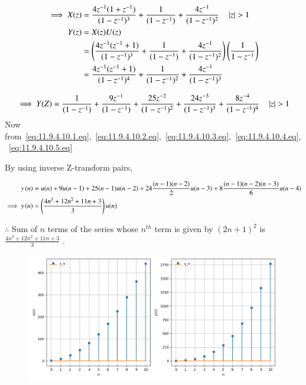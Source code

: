 \documentclass[journal,12pt,onecolumn]{IEEEtran}
\theoremstyle{remark}
\begin{document}
\begin{align}
\implies  X(z)&=\frac{4z^{-1}(1+z^{-1})}{(1-z^{-1})^3} + \frac{1}{(1-z^{-1})} + \frac{4z^{-1}}{(1-z^{-1})^2} \quad \left\vert z\right\vert>1 \\
 Y(z) &= X(z)U(z) \\
 &= \left(\frac{4z^{-1}(z^{-1}+1)}{(1-z^{-1})^3} + \frac{1}{(1-z^{-1})} + \frac{4z^{-1}}{(1-z^{-1})^2}\right)\left(\frac{1}{1-z^{-1}}\right)\\
 &= \frac{4z^{-1}(z^{-1}+1)}{(1-z^{-1})^4} + \frac{1}{(1-z^{-1})^2} + \frac{4z^{-1}}{(1-z^{-1})^3}
 \end{align}
 
 \begin{equation}
\implies Y(Z)=\frac{1}{(1-z^{-1})} +\frac{9z^{-1}}{(1-z^{-1})} + \frac{25z^{-2}}{(1-z^{-1})^2} + \frac{24z^{-3}}{(1-z^{-1})^3} + \frac{8z^{-4}}{(1-z^{-1})^4} \quad \left\vert z\right\vert>1  \label{eq:11.9.4.10.5.eq}
 \end{equation}
Now from~\eqref{eq:11.9.4.10.1.eq},~\eqref{eq:11.9.4.10.2.eq},~\eqref{eq:11.9.4.10.3.eq},~\eqref{eq:11.9.4.10.4.eq},
 ~\eqref{eq:11.9.4.10.5.eq}

By using  inverse Z-transform pairs,


\begin{align}
  y\left(n\right)&= u(n) + 9u(n-1) + 25(n-1)u(n-2) + 24\frac{(n-1)(n-2)}{2}u(n-3) + 8\frac{(n-1)(n-2)(n-3)}{6}u(n-4) \\
\implies  y\left(n\right) &=\left(\frac{4n^{3}+12n^{2}+11n+3}{3}\right)u(n)
\end{align}

$\therefore$ Sum of $n$ terms of the series whose $n^{th}$ term is given by $(2n+1)^2$ is $\frac{4n^{3}+12n^{2}+11n+3}{3}$  .

\begin{figure}[h]
    \centering
     \includegraphics[width=\columnwidth]{./figs/fig2.png}
    \caption{ }
    \label{}
\end{figure}
\end{document}
